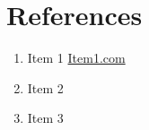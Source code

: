 \section{References}
    \begin{enumerate}[label={\textbf{Step}}]
      \item Item 1 \url{Item1.com}
      \item Item 2
      \item Item 3
    \end{enumerate}